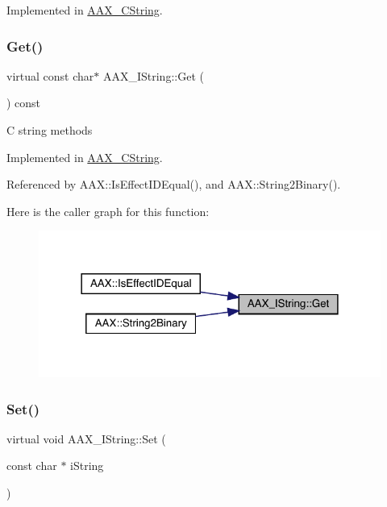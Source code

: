 Implemented in \mbox{\hyperlink{a01573_afa2fe6beae083e3ec266f49d7583473c}{A\+A\+X\+\_\+\+C\+String}}.

\mbox{\label{a01873_a63ff078d3df0d2e0c16c078a2ac4921e}} 
\subsubsection{\texorpdfstring{Get()}{Get()}}
{\footnotesize\ttfamily virtual const char$\ast$ A\+A\+X\+\_\+\+I\+String\+::\+Get (\begin{DoxyParamCaption}{ }\end{DoxyParamCaption}) const\hspace{0.3cm}{\ttfamily [pure virtual]}}

C string methods 

Implemented in \mbox{\hyperlink{a01573_aa0371a2a15513a4d160d4a741c0a953e}{A\+A\+X\+\_\+\+C\+String}}.



Referenced by A\+A\+X\+::\+Is\+Effect\+I\+D\+Equal(), and A\+A\+X\+::\+String2\+Binary().

Here is the caller graph for this function\+:
\nopagebreak
\begin{figure}[H]
\begin{center}
\leavevmode
\includegraphics[width=318pt]{a01873_a63ff078d3df0d2e0c16c078a2ac4921e_icgraph}
\end{center}
\end{figure}
\mbox{\label{a01873_a9ad28fba3ccc952de495f055a10e3b19}} 
\subsubsection{\texorpdfstring{Set()}{Set()}}
{\footnotesize\ttfamily virtual void A\+A\+X\+\_\+\+I\+String\+::\+Set (\begin{DoxyParamCaption}\item[{const char $\ast$}]{i\+String }\end{DoxyParamCaption})\hspace{0.3cm}{\ttfamily [pure virtual]}}



